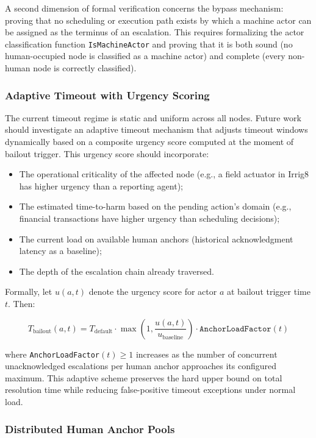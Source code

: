 A second dimension of formal verification concerns the bypass mechanism: proving that no scheduling or execution path exists by which a machine actor can be assigned as the terminus of an escalation. This requires formalizing the actor classification function \texttt{IsMachineActor} and proving that it is both sound (no human-occupied node is classified as a machine actor) and complete (every non-human node is correctly classified).

\subsubsection{Adaptive Timeout with Urgency Scoring}
\label{sec:fw_adaptive_timeout}

The current timeout regime is static and uniform across all nodes. Future work should investigate an adaptive timeout mechanism that adjusts timeout windows dynamically based on a composite urgency score computed at the moment of bailout trigger. This urgency score should incorporate:

\begin{itemize}
    \item The operational criticality of the affected node (e.g., a field actuator in Irrig8 has higher urgency than a reporting agent);
    \item The estimated time-to-harm based on the pending action's domain (e.g., financial transactions have higher urgency than scheduling decisions);
    \item The current load on available human anchors (historical acknowledgment latency as a baseline);
    \item The depth of the escalation chain already traversed.
\end{itemize}

Formally, let $u(a, t)$ denote the urgency score for actor $a$ at bailout trigger time $t$. Then:

\[
T_{\text{bailout}}(a, t) = T_{\text{default}} \cdot \max\left(1, \frac{u(a, t)}{u_{\text{baseline}}}\right) \cdot \texttt{AnchorLoadFactor}(t)
\]

where \texttt{AnchorLoadFactor}$(t) \geq 1$ increases as the number of concurrent unacknowledged escalations per human anchor approaches its configured maximum. This adaptive scheme preserves the hard upper bound on total resolution time while reducing false-positive timeout exceptions under normal load.

\subsubsection{Distributed Human Anchor Pools}
\label{sec:fw_distributed_anchors}

